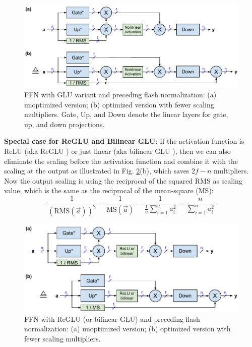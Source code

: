 \documentclass{article}
\numberwithin{equation}{section} %
\def\rms{\text{RMS}(\vec{a})}         %
\def\f1n{\frac{1}{n}}                 %
\def\sas{\sum_{i=1}^n a_i^2}          %
\def\a{\vec{a}}                       %
\begin{document}
\begin{figure}[h!] \centering
  \includegraphics[scale=0.9]{figs/flash_fig3.pdf}
  \caption{FFN with GLU variant and preceding flash normalization: (a) unoptimized version; (b) optimized version with fewer scaling multipliers. Gate, Up, and Down denote the linear layers for gate, up, and down projections.}
\label{fig3} \end{figure}

\textbf{Special case for ReGLU and Bilinear GLU}: If the activation function is ReLU (aka ReGLU \citep{GLU}) or just linear (aka bilinear GLU \citep{GLU}), then we can also eliminate the scaling before the activation function and combine it with the scaling at the output as illustrated in Fig. \ref{fig4}(b), which saves $2f - n$ multipliers. Now the output scaling is using the reciprocal of the squared RMS as scaling value, which is the same as the reciprocal of the mean-square (MS):
\begin{equation*}
  \frac{1}{(\rms)^2} = \frac{1}{\text{MS}(\a)}
  = \frac{1}{\f1n \sas} = \frac{n}{\sas}
\end{equation*}

\begin{figure}[h!] \centering
  \includegraphics[scale=0.9]{figs/flash_fig4.pdf}
  \caption{FFN with ReGLU (or bilinear GLU) and preceding flash normalization: (a) unoptimized version; (b) optimized version with fewer scaling multipliers.}
\label{fig4} \end{figure}
\end{document}
